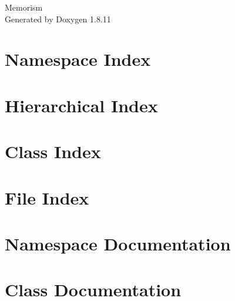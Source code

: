 \documentclass[twoside]{book}
\newcommand{\+}{\discretionary{\mbox{\scriptsize$\hookleftarrow$}}{}{}}
\newcommand{\clearemptydoublepage}{%
  \newpage{\pagestyle{empty}\cleardoublepage}%
}
\begin{document}
\hypersetup{pageanchor=false,
             bookmarksnumbered=true,
             pdfencoding=unicode
            }
\begin{titlepage}
\vspace*{7cm}
\begin{center}%
{\Large Memorism }\\
\vspace*{1cm}
{\large Generated by Doxygen 1.8.11}\\
\end{center}
\end{titlepage}
\clearemptydoublepage
\tableofcontents
\clearemptydoublepage
{}
\hypersetup{pageanchor=true}

\chapter{Namespace Index}

\chapter{Hierarchical Index}

\chapter{Class Index}

\chapter{File Index}

\chapter{Namespace Documentation}




\chapter{Class Documentation}
















\end{document}
